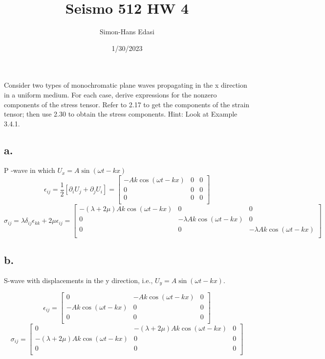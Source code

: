 \documentclass{article}
\title{Seismo 512 HW 4}
\date{1/30/2023}
\author{Simon-Hans Edasi}
\begin{document}
	\maketitle

\section{}

Consider two types of monochromatic plane waves propagating in the x direction in a uniform medium. For each case, derive expressions for the nonzero components of the stress tensor. Refer to 2.17 to get the components of the strain tensor; then use 2.30 to obtain the stress components. Hint: Look at Example 3.4.1.
\subsection*{a.}
P -wave in which $U_{x} = A \sin\left(\omega t - k x\right)$
\[
\epsilon_{ij} = \frac{1}{2} \left[ \partial_{i} U_{j} + \partial_{j} U_{i} \right] = 
\left[ {\begin{array}{ccc}
 -Ak\cos\left(\omega t - kx\right)& 0 & 0\\
    0 & 0 & 0 \\
    0 & 0 & 0 \\
  \end{array} }
  \right]
\]
\[
\sigma_{ij} = \lambda \delta_{ij} \epsilon_{kk} + 2 \mu \epsilon_{ij} = 
\left[ {\begin{array}{ccc}
   - \left(\lambda + 2 \mu \right) Ak \cos\left(\omega t-kx\right)   & 0 & 0\\
    0 &  -\lambda Ak \cos\left(\omega t-kx\right) & 0 \\
    0 & 0 &  -\lambda  Ak \cos\left(\omega t-kx\right) \\
  \end{array} }
  \right]
\]
\subsection*{b.} S-wave with displacements in the y direction, i.e., $U_{y} = A \sin\left(\omega t - k x\right)$. 


\[
\epsilon_{ij} = 
\left[ {\begin{array}{ccc}
    0 & -Ak\cos\left(\omega t - kx\right) & 0\\
    -Ak\cos\left(\omega t - kx\right) & 0 & 0 \\
    0 & 0 & 0 \\
  \end{array} }
  \right]
\]
\[
\sigma_{ij} = 
\left[ {\begin{array}{ccc}
    0 & - \left(\lambda + 2 \mu \right) Ak \cos\left(\omega t-kx\right) & 0\\
    - \left(\lambda + 2 \mu \right) Ak \cos\left(\omega t-kx\right) & 0 & 0 \\
    0 & 0 & 0 \\
  \end{array} }
  \right]
\]
\end{document}
